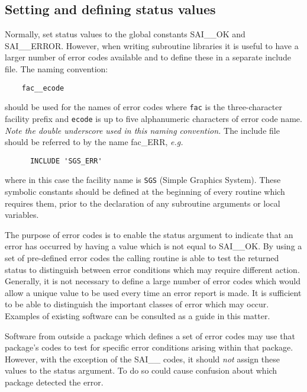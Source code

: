 \subsection {Setting and defining status values}

Normally, set status values to the global constants SAI\_\_OK and SAI\_\_ERROR.
However, when writing subroutine libraries it is useful to have a larger 
number of error codes available and to define these in a separate include file.
The naming convention:

\begin{small}
\begin{verbatim}
    fac__ecode
\end{verbatim}
\end{small}

should be used for the names of error codes where {\tt fac} is the
three-character facility prefix and {\tt ecode} is up to five alphanumeric
characters of error code name. 
{\em Note the double underscore used in this naming convention.}
The include file should be referred to by the name fac\_ERR, {\em e.g.}

\begin{small}
\begin{verbatim}
      INCLUDE 'SGS_ERR'
\end{verbatim}
\end{small}

where in this case the facility name is {\tt SGS} (Simple Graphics System).
These symbolic constants should be defined at the beginning of every
routine which requires them, prior to the declaration of any subroutine
arguments or local variables. 

The purpose of error codes is to enable the status argument to indicate that an 
error has occurred by having a value which is not equal to SAI\_\_OK.
By using a set of pre-defined error codes the calling routine is able to test
the returned status to distinguish between error conditions which may require
different action.
Generally, it is not necessary to define a large number of error codes which
would allow a unique value to be used every time an error report is made. 
It is sufficient to be able to distinguish the important classes of error which
may occur. 
Examples of existing software can be consulted as a guide in this matter.

Software from outside a package which defines a set of error codes may
use that package's codes to test for specific error conditions arising within
that package.
However, with the exception of the SAI\_\_ codes, it should {\em not} assign
these values to the status argument.
To do so could cause confusion about which package detected the error. 

